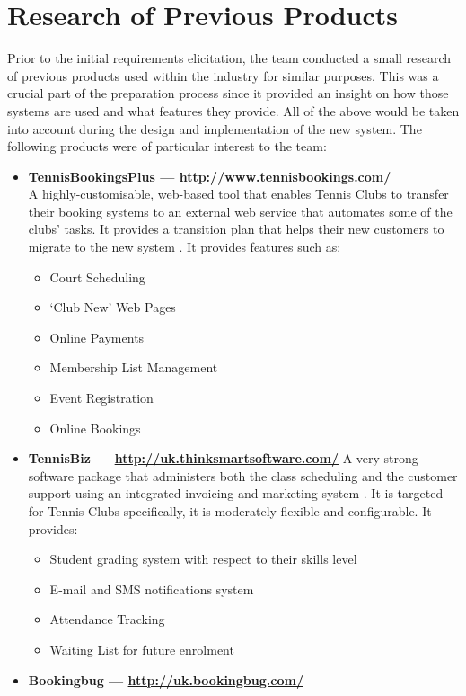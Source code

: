 \documentclass{l3proj}
\begin{document}
\section{Research of Previous Products}
\par
Prior to the initial requirements elicitation, the team conducted a small research of previous products used within the industry for similar purposes. This was a crucial part of the preparation process since it provided an insight on how those systems are used and what features they provide. All of the above would be taken into account during the design and implementation of the new system. The following products were of particular interest to the team:
\begin{itemize}
\item \textbf{TennisBookingsPlus --- \url{http://www.tennisbookings.com/}}\\
A highly-customisable, web-based tool that enables Tennis Clubs to transfer their booking systems to an external web service that automates some of the clubs' tasks. It provides a transition plan that helps their new customers to migrate to the new system \cite{plus}. It provides features such as:
		\begin{itemize}
	\item Court Scheduling
	\item `Club New' Web Pages
	\item Online Payments
	\item Membership List Management
	\item Event Registration
	\item Online Bookings 
		\end{itemize}
\item \textbf{TennisBiz --- \url{http://uk.thinksmartsoftware.com/}}
A very strong software package that administers both the class scheduling and the customer support using an integrated invoicing and marketing system \cite{biz}. It is targeted for Tennis Clubs specifically, it is moderately flexible and configurable. It provides:
		\begin{itemize}
	\item Student grading system with respect to their skills level
	\item E-mail and SMS notifications system
	\item Attendance Tracking
	\item Waiting List for future enrolment 
		\end{itemize}
\item \textbf{Bookingbug --- \url{http://uk.bookingbug.com/}}

\end{itemize}
\end{document}

